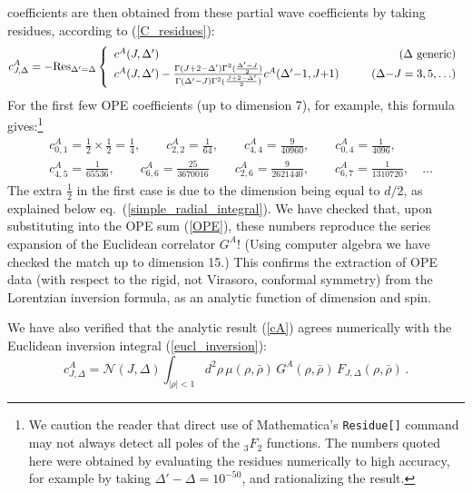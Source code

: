 \documentclass[11pt, reqno,preprint]{article}
\def\be{\begin{equation}}
\def\ee{\end{equation}}
\def\rhobar{\bar{\rho}}
\def\j{J}
\def\c{c}
\begin{document}
\begin{appendix}
coefficients are then obtained from these partial wave coefficients by taking residues, according to (\ref{C_residues}):
\be
 c_{\j,\Delta}^A =
 -{\rm Res}_{\Delta'=\Delta}\left\{\begin{array}{l@{\hspace{10mm}}r}
 \c^A(\j,\Delta') & \mbox{($\Delta$ generic)}\\
 \c^A(\j,\Delta') -\frac{\Gamma(\j+2-\Delta')\Gamma^2(\frac{\Delta'-\j}{2})}
 {\Gamma(\Delta'-\j)\Gamma^2(\frac{\j+2-\Delta'}{2})} \c^A(\Delta'{-}1,\j{+}1) &
 (\Delta{-}\j=3,5,\ldots)
\end{array}\right.
\ee
For the first few OPE coefficients (up to dimension 7), for example, this formula gives:\footnote{We caution the reader that direct use
of Mathematica's \texttt{Residue[]} command may not always detect all poles of the ${}_3F_2$ functions.
The numbers quoted here were obtained by evaluating the residues numerically to high accuracy,
for example by taking $\Delta'-\Delta=10^{-50}$, and rationalizing the result.
}
\be\begin{aligned}
&c^A_{0,1}=\frac12\times\frac12=\frac14,\qquad c^A_{2,2} =\frac{1}{64},\qquad c^A_{4,4} = \frac{9}{40960},\qquad c^A_{0,4}=\frac{1}{4096},\\
&c^A_{4,5}=\frac{1}{65536},\qquad c^A_{6,6}=\frac{25}{3 670 016}\qquad c^A_{2,6}=\frac{9}{2621440},\qquad c^A_{6,7}=\frac{1}{1310720},\quad \ldots
\end{aligned}\ee
The extra $\frac12$ in the first case is due to the dimension being equal to $d/2$, as explained below eq.~(\ref{simple_radial_integral}).
We have checked that, upon substituting into the OPE sum (\ref{OPE}), these numbers reproduce the series expansion of the Euclidean correlator $G^A$!
(Using computer algebra we have checked the match up to dimension 15.)
This confirms the extraction of OPE data (with respect to the rigid, not Virasoro, conformal symmetry)
from the Lorentzian inversion formula, as an analytic function of dimension and spin.

We have also verified that the analytic result (\ref{cA}) agrees numerically with the Euclidean inversion integral (\ref{eucl_inversion}):
\be
 c^A_{\j,\Delta} = \mathcal{N}(\j,\Delta)\int_{|\rho|<1} d^2\rho\,\mu(\rho,\rhobar) \,G^A(\rho,\rhobar)\,F_{\j,\Delta}(\rho,\rhobar)\,.
\ee

\end{appendix}



\end{document}
